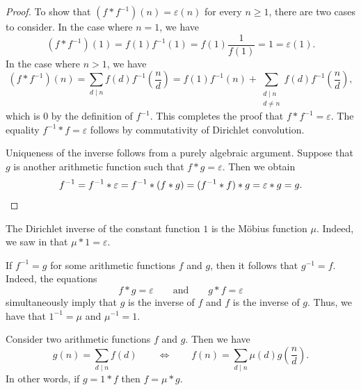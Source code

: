 \begin{proof}
  To show that $(f\ast f^{-1})(n)=\varepsilon(n)$ for every $n\geq 1$, there are two cases to consider. In the case where $n=1$, we have
  \begin{equation*}
    (f\ast f^{-1})(1) = f(1)f^{-1}(1) = f(1)\frac{1}{f(1)} = 1 = \varepsilon(1).
  \end{equation*}
  In the case where $n>1$,  we have
  \begin{equation*}
    (f\ast f^{-1})(n) = \sum_{d\mid n}f(d)f^{-1}\left(\frac{n}{d}\right)= f(1)f^{-1}(n)+ \sum_{\substack{d\mid n \\ d\neq n}}f(d)f^{-1}\left(\frac{n}{d}\right),
  \end{equation*}
  which is $0$ by the definition of $f^{-1}$. This completes the proof that $f\ast f^{-1}=\varepsilon$. The equality $f^{-1}\ast f=\varepsilon$ follows by commutativity of Dirichlet convolution.

  Uniqueness of the inverse follows from a purely algebraic argument. Suppose that $g$ is another arithmetic function such that $f\ast g=\varepsilon$. Then we obtain
  \begin{equation*}
    f^{-1} = f^{-1} \ast \varepsilon = f^{-1}\ast (f\ast g) = (f^{-1}\ast f)\ast g = \varepsilon \ast g = g.\qedhere
  \end{equation*}
\end{proof}

\begin{example}
  The Dirichlet inverse of the constant function $1$ is the M\"obius function $\mu$. Indeed, we saw in  that $\mu\ast 1=\varepsilon$.
\end{example}

\begin{remark}
  If $f^{-1}=g$ for some arithmetic functions $f$ and $g$, then it follows that $g^{-1}=f$. Indeed, the equations
  \begin{equation*}
    f\ast g=\varepsilon\qquad\text{and}\qquad g\ast f=\varepsilon
  \end{equation*}
  simultaneously imply that $g$ is the inverse of $f$ and $f$ is the inverse of $g$. Thus, we have that $1^{-1}=\mu$ and $\mu^{-1}=1$.
\end{remark}

\begin{theorem}
  Consider two arithmetic functions $f$ and $g$. Then we have
  \begin{equation*}
    g(n)=\sum_{d\mid n}f(d)\qquad\Leftrightarrow\qquad f(n)=\sum_{d\mid n}\mu(d)g\left(\frac{n}{d}\right).
  \end{equation*}
  In other words, if $g=1\ast f$ then $f=\mu\ast g$.
\end{theorem}

